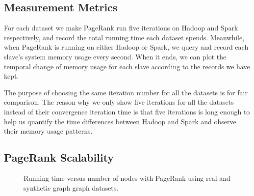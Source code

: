 \documentclass[12pt,conference,letterpaper]{IEEEtran}
\begin{document}
\subsection{Measurement Metrics}
For each dataset we make PageRank run five iterations on Hadoop and Spark respectively, and record the total running time each dataset spends. Meanwhile, when PageRank is running on either Hadoop or Spark, we query and record each slave's system memory usage every second. When it ends, we can plot the temporal change of memory usage for each slave according to the records we have kept.

The purpose of choosing the same iteration number for all the datasets is for fair comparison. The reason why we only show five iterations for all the datasets instead of their convergence iteration time is that five iterations is long enough to help us quantify the time differences between Hadoop and Spark and observe their memory usage patterns.



\subsection{PageRank Scalability}

\begin{figure}[!t]
    \centering
    \caption{Running time versus number of nodes with PageRank using real and synthetic graph graph datasets.}
    \label{fig:time_vs_size}
\end{figure}
\end{document}
